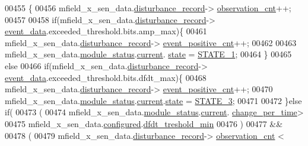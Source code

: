\begin{DoxyCode}
00455         \{
00456             mfield\_x\_sen\_data.\hyperlink{a00025_ac9b38e2c1d3f1013a88d33506c754152}{disturbance\_record}->
      \hyperlink{a00028_ad5b0bac02ce266b91b2b52a1c3ea1d78}{observation\_cnt}++;
00457 
00458             \textcolor{keywordflow}{if}(mfield\_x\_sen\_data.\hyperlink{a00025_ac9b38e2c1d3f1013a88d33506c754152}{disturbance\_record}->
      \hyperlink{a00028_a8c0bda69e71ef674e60da47ad0be9ab0}{event\_data}.exceeded\_threshold.bits.amp\_max)\{
00461                  mfield\_x\_sen\_data.\hyperlink{a00025_ac9b38e2c1d3f1013a88d33506c754152}{disturbance\_record}->
      \hyperlink{a00028_a7397b9d76d4b57500f27bb23d258a18a}{event\_positive\_cnt}++;
00462 
00463                  mfield\_x\_sen\_data.\hyperlink{a00025_adfab5a5d8b45a93dfb13edb24e2b80e3}{module\_status}.\hyperlink{a00019_acf41ffc11da291c2f9f0fcb02ee72b98}{current}.
      \hyperlink{a00019_a6b8d8e916bc56265a3fd279bd26b6d1b}{state} = \hyperlink{a00021_a727351838367f27ac0adb9a13422c342}{STATE\_1};
00464             \}
00465             \textcolor{keywordflow}{else}
00466              \textcolor{keywordflow}{if}(mfield\_x\_sen\_data.\hyperlink{a00025_ac9b38e2c1d3f1013a88d33506c754152}{disturbance\_record}->
      \hyperlink{a00028_a8c0bda69e71ef674e60da47ad0be9ab0}{event\_data}.exceeded\_threshold.bits.dfdt\_max)\{
00468                mfield\_x\_sen\_data.\hyperlink{a00025_ac9b38e2c1d3f1013a88d33506c754152}{disturbance\_record}->
      \hyperlink{a00028_a7397b9d76d4b57500f27bb23d258a18a}{event\_positive\_cnt}++;
00470                mfield\_x\_sen\_data.\hyperlink{a00025_adfab5a5d8b45a93dfb13edb24e2b80e3}{module\_status}.\hyperlink{a00019_acf41ffc11da291c2f9f0fcb02ee72b98}{current}.\hyperlink{a00019_a6b8d8e916bc56265a3fd279bd26b6d1b}{state} = 
      \hyperlink{a00021_ad87f1bc8466a25d9f7da68717d324a22}{STATE\_3};
00471 
00472              \}\textcolor{keywordflow}{else} \textcolor{keywordflow}{if}(
00473                      (
00474                      mfield\_x\_sen\_data.\hyperlink{a00025_adfab5a5d8b45a93dfb13edb24e2b80e3}{module\_status}.\hyperlink{a00019_acf41ffc11da291c2f9f0fcb02ee72b98}{current}.
      \hyperlink{a00019_a0f645dd76b41adc6a966feba8e4bff8c}{change\_per\_time}>
00475                      mfield\_x\_sen\_data.\hyperlink{a00025_a94b2d1f6ea4ab334c74d24984dd27843}{configured}.\hyperlink{a00021_a6f5257920e763b7f5f440bc0515cd963}{dfdt\_treshold\_min}
00476                      )
00477                      &&
00478                      (
00479                      mfield\_x\_sen\_data.\hyperlink{a00025_ac9b38e2c1d3f1013a88d33506c754152}{disturbance\_record}->
      \hyperlink{a00028_ad5b0bac02ce266b91b2b52a1c3ea1d78}{observation\_cnt} <

\end{DoxyCode}
